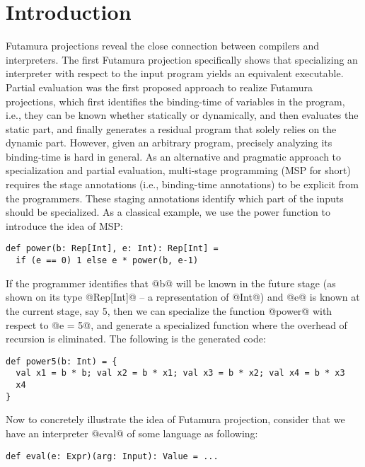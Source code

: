 \section{Introduction}

Futamura projections \cite{Futamura1999, futamura1971partial} reveal the close
connection between compilers and interpreters. The first Futamura projection
specifically shows that specializing an interpreter with respect to the input
program yields an equivalent executable. Partial evaluation
\cite{DBLP:books/daglib/0072559} was the first proposed approach to realize
Futamura projections, which first identifies the binding-time of variables in
the program, i.e., they can be known whether statically or dynamically, and then
evaluates the static part, and finally generates a residual program that solely
relies on the dynamic part. However, given an arbitrary program, precisely
analyzing its binding-time is hard in general. As an alternative and pragmatic
approach to specialization and partial evaluation, multi-stage programming (MSP
for short) \cite{taha1999multi, DBLP:conf/pepm/TahaS97} requires the stage
annotations (i.e., binding-time annotations) to be explicit from the programmers.
These staging annotations identify which part of the inputs should be
specialized. As a classical example, we use the power function to introduce
the idea of MSP:

\begin{lstlisting}
def power(b: Rep[Int], e: Int): Rep[Int] = 
  if (e == 0) 1 else e * power(b, e-1)
\end{lstlisting}

If the programmer identifies that @b@ will be known in the future stage (as shown
on its type @Rep[Int]@ -- a representation of @Int@) and @e@ is known at the
current stage, say 5, then we can specialize the function @power@ with
respect to @e = 5@, and generate a specialized function where the overhead of
recursion is eliminated. The following is the generated code:

\begin{lstlisting}
def power5(b: Int) = {
  val x1 = b * b; val x2 = b * x1; val x3 = b * x2; val x4 = b * x3
  x4
}
\end{lstlisting}

Now to concretely illustrate the idea of Futamura projection, consider that we
have an interpreter @eval@ of some language as following:

\begin{lstlisting}
def eval(e: Expr)(arg: Input): Value = ...
\end{lstlisting}

